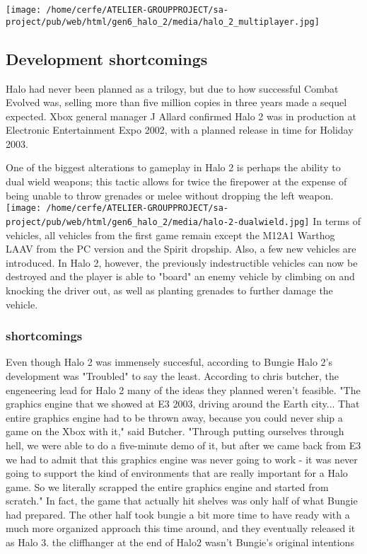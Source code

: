 \documentclass[a4paper,10pt]{book}
\begin{document}
 \texttt{[image: /home/cerfe/ATELIER-GROUPPROJECT/sa-project/pub/web/html/gen6\_halo\_2/media/halo\_2\_multiplayer.jpg]}
 \subsection{Development  shortcomings }
 
          Halo had never been planned as a trilogy, but due to how successful  Combat Evolved was, selling more than five million copies in three years made a sequel expected. Xbox general manager J Allard confirmed Halo 2 was in production at Electronic Entertainment Expo 2002,
          with a planned release in time for Holiday 2003.
         
 
          One of the biggest alterations to gameplay in Halo 2 is perhaps the ability to dual wield weapons; this tactic allows for twice the firepower at the expense of being unable to throw grenades or melee without dropping the left weapon. 
             \texttt{[image: /home/cerfe/ATELIER-GROUPPROJECT/sa-project/pub/web/html/gen6\_halo\_2/media/halo-2-dualwield.jpg]}  
          In terms of vehicles, all vehicles from the first game remain except the M12A1 Warthog LAAV from the PC version and the Spirit dropship. Also, a few new vehicles are introduced. In Halo 2, however,
          the previously indestructible vehicles can now be destroyed and the player is able to "board" an enemy vehicle by climbing on and knocking the driver out, as well as planting grenades to further damage the vehicle.
         
 
 \subsubsection{shortcomings }
 
          Even though Halo 2 was immensely succesful, according to Bungie Halo 2's development was "Troubled" to say the least. According  to chris butcher, the engeneering lead for Halo 2
          many of the ideas they planned weren't feasible. "The graphics engine that we showed at E3 2003, driving around the Earth city... That entire graphics engine had to be thrown away,
          because you could never ship a game on the Xbox with it," said Butcher. "Through putting ourselves through hell, we were able to do a five-minute demo of it, but after we came back from E3
          we had to admit that this graphics engine was never going to work - it was never going to support the kind of environments that are really important for a Halo game. So we literally scrapped
          the entire graphics engine and started from scratch." In fact, the game that actually hit shelves was only half of what Bungie had prepared. The other half took bungie a bit more time 
          to have ready with a much more organized approach this time around, and they eventually released it as Halo 3. the cliffhanger at the end of Halo2 wasn't Bungie's original intentions
         
\end{document}

